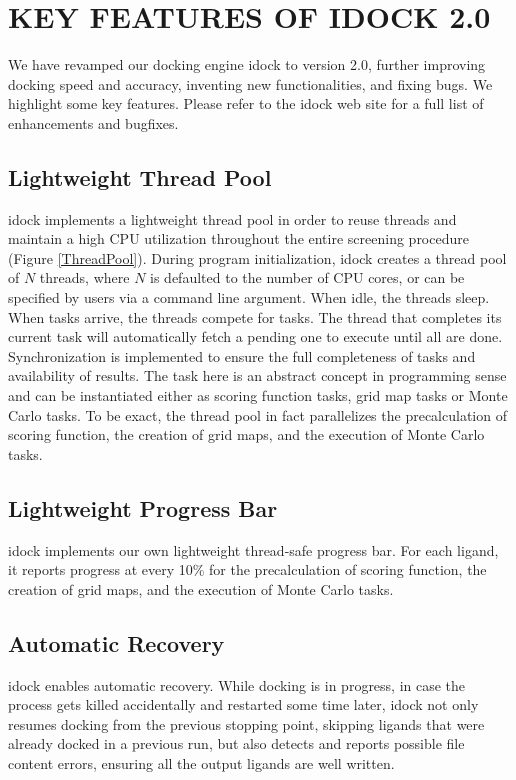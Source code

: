 \documentclass[12pt]{article}
\begin{document}
\section*{\sffamily \Large KEY FEATURES OF IDOCK 2.0}

We have revamped our docking engine idock to version 2.0, further improving docking speed and accuracy, inventing new functionalities, and fixing bugs. We highlight some key features. Please refer to the idock web site for a full list of enhancements and bugfixes.

\subsection*{\sffamily \large Lightweight Thread Pool}

idock implements a lightweight thread pool in order to reuse threads and maintain a high CPU utilization throughout the entire screening procedure (Figure \ref{ThreadPool}). During program initialization, idock creates a thread pool of $N$ threads, where $N$ is defaulted to the number of CPU cores, or can be specified by users via a command line argument. When idle, the threads sleep. When tasks arrive, the threads compete for tasks. The thread that completes its current task will automatically fetch a pending one to execute until all are done. Synchronization is implemented to ensure the full completeness of tasks and availability of results. The task here is an abstract concept in programming sense and can be instantiated either as scoring function tasks, grid map tasks or Monte Carlo tasks. To be exact, the thread pool in fact parallelizes the precalculation of scoring function, the creation of grid maps, and the execution of Monte Carlo tasks.

\subsection*{\sffamily \large Lightweight Progress Bar}

idock implements our own lightweight thread-safe progress bar. For each ligand, it reports progress at every 10\% for the precalculation of scoring function, the creation of grid maps, and the execution of Monte Carlo tasks.

\subsection*{\sffamily \large Automatic Recovery}

idock enables automatic recovery. While docking is in progress, in case the process gets killed accidentally and restarted some time later, idock not only resumes docking from the previous stopping point, skipping ligands that were already docked in a previous run, but also detects and reports possible file content errors, ensuring all the output ligands are well written.
\end{document}
